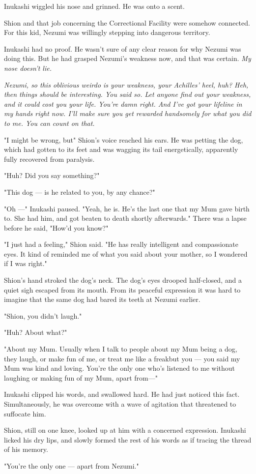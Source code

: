 Inukashi wiggled his nose and grinned. He was onto a scent.

Shion and that job concerning the Correctional Facility were somehow
connected. For this kid, Nezumi was willingly stepping into dangerous
territory.

Inukashi had no proof. He wasn't sure of any clear reason for why Nezumi
was doing this. But he had grasped Nezumi's weakness now, and that was
certain. \emph{My nose doesn't lie.}

\emph{Nezumi, so this oblivious weirdo is your weakness, your Achilles' heel,
huh? Heh, then things should be interesting. You said so. Let anyone
find out your weakness, and it could cost you your life. You're damn
right. And I've got your lifeline in my hands right now. I'll make sure
you get rewarded handsomely for what you did to me. You can count on
that.}

"I might be wrong, but\el " Shion's voice reached his ears. He was
petting the dog, which had gotten to its feet and was wagging its tail
energetically, apparently fully recovered from paralysis.

"Huh? Did you say something?"

"This dog --- is he related to you, by any chance?"

"Oh ---" Inukashi paused. "Yeah, he is. He's the last one that my Mum gave
birth to. She had him, and got beaten to death shortly afterwards."
There was a lapse before he said, "How'd you know?"

"I just had a feeling," Shion said. "He has really intelligent and
compassionate eyes. It kind of reminded me of what you said about your
mother, so I wondered if I was right."

Shion's hand stroked the dog's neck. The dog's eyes drooped half-closed,
and a quiet sigh escaped from its mouth. From its peaceful expression it
was hard to imagine that the same dog had bared its teeth at Nezumi
earlier.

"Shion, you didn't laugh."

"Huh? About what?"

"About my Mum. Usually when I talk to people about my Mum being a dog,
they laugh, or make fun of me, or treat me like a freak\el but you --- you
said my Mum was kind and loving. You're the only one who's listened to
me without laughing or making fun of my Mum, apart from---"

Inukashi clipped his words, and swallowed hard. He had just noticed this
fact. Simultaneously, he was overcome with a wave of agitation that
threatened to suffocate him.

Shion, still on one knee, looked up at him with a concerned expression.
Inukashi licked his dry lips, and slowly formed the rest of his words as
if tracing the thread of his memory.

"You're the only one --- apart from Nezumi."